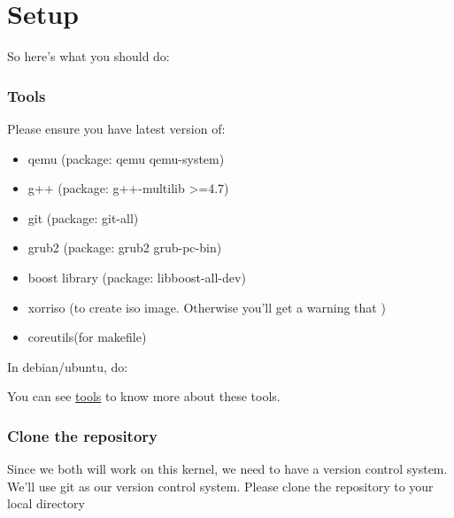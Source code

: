 \documentclass[]{book}
\newenvironment{Shaded}{}{}
\newcommand{\KeywordTok}[1]{\textbf{{#1}}}
\newcommand{\NormalTok}[1]{{#1}}
\begin{document}
\section*{Setup}\label{setup}

So here's what you should do:

\subsubsection*{Tools}\label{tools}

Please ensure you have latest version of:

\begin{itemize}
\itemsep1pt\parskip0pt
\item
  qemu (package: qemu qemu-system)
\item
  g++ (package: g++-multilib \textgreater{}=4.7)
\item
  git (package: git-all)
\item
  grub2 (package: grub2 grub-pc-bin)
\item
  boost library (package: libboost-all-dev)
\item
  xorriso (to create iso image. Otherwise you'll get a warning that )
\item
  coreutils(for makefile)
\end{itemize}

In debian/ubuntu, do:

\begin{Shaded}
\end{Shaded}

You can see
\href{http://www.cse.iitd.ac.in/~sbansal/os/tools.html}{tools} to know
more about these tools.

\subsubsection*{Clone the repository}\label{clone-the-repository}

Since we both will work on this kernel, we need to have a version
control system. We'll use git as our version control system. Please
clone the repository to your local directory
\end{document}
